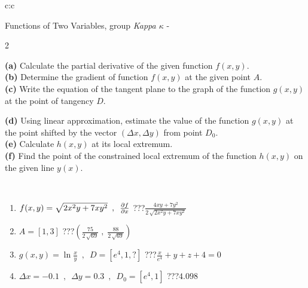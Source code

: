 \documentclass[10pt]{report}
\begin{document}
\begin{tabular}{c:c}
\begin{minipage}[c][104.5mm][t]{0.5\linewidth}
\begin{center}
\vspace{7mm}
{\huge \LARGE Functions of Two Variables, group \textit{Kappa $\kappa$} -}\\[5mm]
\begin{minipage}{0.95\linewidth}
\begin{center}
{\small \begin{multicols}{2} \raggedright
\textbf{(a)} Calculate the partial derivative of the given function \(f(x,y)\). \\[1mm]
\textbf{(b)} Determine the gradient of function \(f(x,y)\) at the given point \(A\). \\[1mm]
\textbf{(c)} Write the equation of the tangent plane to the graph of the function \(g(x,y)\) at the point of tangency \(D\). \par \columnbreak
\textbf{(d)} Using linear approximation, estimate the value of the function \(g(x,y)\) at the point shifted by the vector \((\Delta x, \Delta y)\) from point \(D_0\). \\[1mm]
\textbf{(e)} Calculate \(h(x,y)\) at its local extremum. \\[1mm]
\textbf{(f)} Find the point of the constrained local extremum of the function \(h(x,y)\) on the given line \(y(x)\). \\[1mm]
\end{multicols}
}
\end{center}
\end{minipage}
\\[4mm]
\begin{minipage}{0.79\linewidth}
\begin{center}
\begin{varwidth}{\linewidth}
\begin{enumerate}
\normalsizerr
\item $f(x,y) = \sqrt{2x^2y + 7xy^2}\enspace , \enspace \pdv{f}{x}$\quad \dotfill\; ???\;\dotfill \quad $\frac{4xy+7y^2}{2\,\sqrt{2x^2y+7xy^2}}$
\item $A = [1, 3]$\quad \dotfill\; ???\;\dotfill \quad $\left( \frac{75}{2\,\sqrt{69}} \;,\; \frac{88}{2\,\sqrt{69}} \right)$
\item $g(x,y) = \ln\frac{x}{y} \enspace , \enspace D=[e^{4},1,?]$\quad \dotfill\; ???\;\dotfill \quad $\frac{x}{e^4} + y + z + 4 = 0$
\item $\Delta x = {-0.1} \enspace,\enspace \Delta y = {0.3} \enspace,\enspace D_0 = [e^{4},1]$\quad \dotfill\; ???\;\dotfill \quad $4.098$

\end{enumerate}
\end{varwidth}
\end{center}
\end{minipage}
\end{center}
\end{minipage}
\end{tabular}
\end{document}
